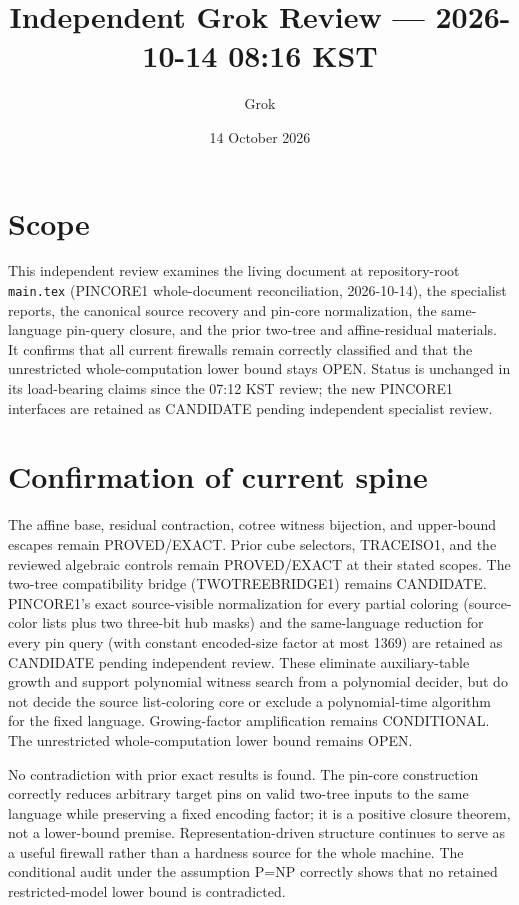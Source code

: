 \documentclass[11pt]{article}
\title{Independent Grok Review --- 2026-10-14 08:16 KST}
\author{Grok}
\date{14 October 2026}
\begin{document}
\maketitle

\begin{center}
\end{center}

\section{Scope}
This independent review examines the living document at repository-root \texttt{main.tex} (PINCORE1 whole-document reconciliation, 2026-10-14), the specialist reports, the canonical source recovery and pin-core normalization, the same-language pin-query closure, and the prior two-tree and affine-residual materials. It confirms that all current firewalls remain correctly classified and that the unrestricted whole-computation lower bound stays OPEN. Status is unchanged in its load-bearing claims since the 07:12 KST review; the new PINCORE1 interfaces are retained as CANDIDATE pending independent specialist review.

\section{Confirmation of current spine}
The affine base, residual contraction, cotree witness bijection, and upper-bound escapes remain PROVED/EXACT. Prior cube selectors, TRACEISO1, and the reviewed algebraic controls remain PROVED/EXACT at their stated scopes. The two-tree compatibility bridge (TWOTREEBRIDGE1) remains CANDIDATE. PINCORE1's exact source-visible normalization for every partial coloring (source-color lists plus two three-bit hub masks) and the same-language reduction for every pin query (with constant encoded-size factor at most 1369) are retained as CANDIDATE pending independent review. These eliminate auxiliary-table growth and support polynomial witness search from a polynomial decider, but do not decide the source list-coloring core or exclude a polynomial-time algorithm for the fixed language. Growing-factor amplification remains CONDITIONAL. The unrestricted whole-computation lower bound remains OPEN.

No contradiction with prior exact results is found. The pin-core construction correctly reduces arbitrary target pins on valid two-tree inputs to the same language while preserving a fixed encoding factor; it is a positive closure theorem, not a lower-bound premise. Representation-driven structure continues to serve as a useful firewall rather than a hardness source for the whole machine. The conditional audit under the assumption P=NP correctly shows that no retained restricted-model lower bound is contradicted.
\end{document}

